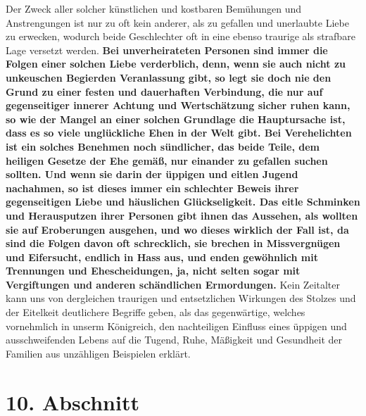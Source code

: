 Der Zweck aller solcher künstlichen und kostbaren Bemühungen und Anstrengungen
ist nur zu oft kein anderer, als zu gefallen und unerlaubte Liebe zu erwecken,
wodurch beide Geschlechter oft in eine ebenso traurige als strafbare Lage
versetzt werden. 
\label{ref:11_09_kaputte_ehen} \textbf{Bei
unverheirateten Personen sind immer die Folgen einer
solchen Liebe verderblich, denn, wenn sie auch nicht zu unkeuschen Begierden
Veranlassung gibt, so legt sie doch nie den Grund zu einer festen und
dauerhaften Verbindung, die nur auf gegenseitiger innerer Achtung und
Wertschätzung sicher ruhen kann, so wie der Mangel an einer solchen Grundlage
die Hauptursache ist, dass es so viele unglückliche Ehen in der Welt gibt. Bei
Verehelichten ist ein solches Benehmen noch sündlicher, das beide Teile, dem
heiligen Gesetze der Ehe gemäß, nur einander zu gefallen suchen sollten. Und
wenn sie darin der üppigen und eitlen Jugend nachahmen, so ist dieses immer ein
schlechter Beweis ihrer gegenseitigen Liebe und häuslichen Glückseligkeit. Das
eitle Schminken und Herausputzen ihrer Personen gibt ihnen das Aussehen, als
wollten sie auf Eroberungen ausgehen, und wo dieses wirklich der Fall ist, da
sind die Folgen davon oft schrecklich, sie brechen in Missvergnügen und
Eifersucht, endlich in Hass aus, und enden gewöhnlich mit Trennungen und
Ehescheidungen, ja, nicht selten sogar mit Vergiftungen und anderen schändlichen
Ermordungen.} Kein Zeitalter kann uns von dergleichen traurigen und entsetzlichen
Wirkungen des Stolzes und der Eitelkeit deutlichere Begriffe geben, als das
gegenwärtige, welches vornehmlich in unserm Königreich, den nachteiligen
Einfluss eines üppigen und ausschweifenden Lebens auf die Tugend, Ruhe,
Mäßigkeit
und Gesundheit der Familien aus unzähligen Beispielen erklärt.

\section{10. Abschnitt} \label{kap11_ab10}

